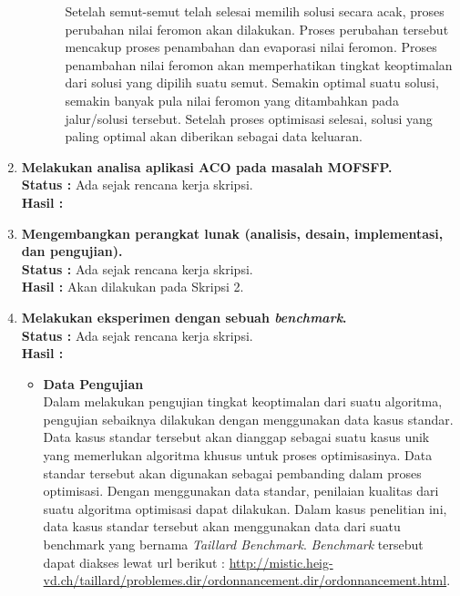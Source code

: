 \documentclass[a4paper,twoside]{article}
\begin{document}
\begin{enumerate}
\begin{itemize}
\begin{enumerate}
			Setelah semut-semut telah selesai memilih solusi secara acak, proses perubahan nilai feromon
			akan dilakukan. Proses perubahan tersebut mencakup proses penambahan dan evaporasi nilai
			feromon. Proses penambahan nilai feromon akan memperhatikan tingkat keoptimalan dari solusi
			yang dipilih suatu semut. Semakin optimal suatu solusi, semakin banyak pula nilai feromon yang
			ditambahkan pada jalur/solusi tersebut. Setelah proses optimisasi selesai, solusi yang paling optimal
			akan diberikan sebagai data keluaran.
			
		\end{enumerate}
	
		
		
		
		
		
		\end{itemize}
		
		
		
		\item \textbf{Melakukan analisa aplikasi ACO pada masalah MOFSFP.}\\
		{\bf Status :} Ada sejak rencana kerja skripsi.\\
		{\bf Hasil :}

		\item \textbf{Mengembangkan perangkat lunak (analisis, desain, implementasi, dan pengujian).}\\
		{\bf Status :} Ada sejak rencana kerja skripsi.\\
		{\bf Hasil :} Akan dilakukan pada Skripsi 2.
		
	
		\item \textbf{Melakukan eksperimen dengan sebuah {\it benchmark}.}\\
		{\bf Status :} Ada sejak rencana kerja skripsi.\\
		{\bf Hasil :}
		\begin{itemize}
		\item {\bf Data Pengujian}\\
		Dalam melakukan pengujian tingkat keoptimalan dari suatu algoritma, pengujian sebaiknya dilakukan
		dengan menggunakan data kasus standar. Data kasus standar tersebut akan dianggap sebagai
		suatu kasus unik yang memerlukan algoritma khusus untuk proses optimisasinya. Data standar tersebut
		akan digunakan sebagai pembanding dalam proses optimisasi. Dengan menggunakan data
		standar, penilaian kualitas dari suatu algoritma optimisasi dapat dilakukan. Dalam kasus penelitian ini, data kasus standar tersebut akan menggunakan data dari suatu benchmark yang bernama {\it Taillard Benchmark}. {\it Benchmark} tersebut dapat diakses lewat url berikut : \url{http://mistic.heig-vd.ch/taillard/problemes.dir/ordonnancement.dir/ordonnancement.html}.
		

\end{itemize}
\end{enumerate}
\end{document}
